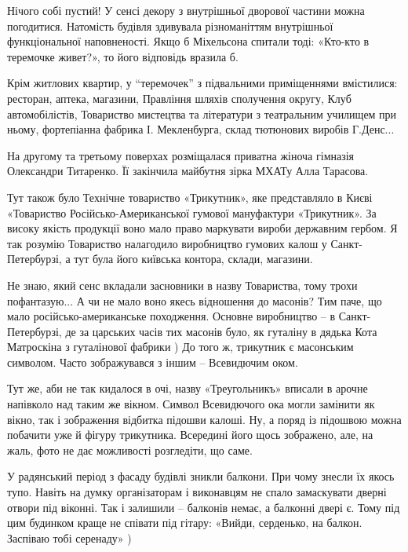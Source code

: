 Нічого собі пустий! У сенсі декору з внутрішньої дворової частини можна
погодитися. Натомість будівля здивувала різноманіттям внутрішньої
функціональної наповненості. Якщо б Міхельсона спитали тоді: «Кто-кто в
теремочке живет?», то його відповідь вразила б.

Крім житлових квартир, у \enquote{теремочек} з підвальними приміщеннями вмістилися:
ресторан, аптека, магазини, Правління шляхів сполучення округу, Клуб
автомобілістів, Товариство мистецтва та літератури з театральним училищем при
ньому, фортепіанна фабрика І. Мекленбурга, склад тютюнових виробів Г.Денс...

На другому та третьому поверхах розміщалася приватна жіноча гімназія Олександри
Титаренко. Її закінчила майбутня зірка МХАТу Алла Тарасова.

Тут також було Технічне товариство «Трикутник», яке представляло в Києві
«Товариство Російсько-Американської гумової мануфактури «Трикутник». За високу
якість продукції воно мало право маркувати вироби державним гербом. Я так
розумію Товариство налагодило виробництво гумових калош у Санкт-Петербурзі, а
тут була його київська контора, склади, магазини.

Не знаю, який сенс вкладали засновники в назву Товариства, тому трохи
пофантазую... А чи не мало воно якесь відношення до масонів? Тим паче, що мало
російсько-американське походження. Основне виробництво – в Санкт-Петербурзі, де
за царських часів тих масонів було, як гуталіну в дядька Кота Матроскіна з
гуталінової фабрики ) До того ж, трикутник є масонським символом. Часто
зображувався з іншим – Всевидючим оком.

Тут же, аби не так кидалося в очі, назву «Треугольникъ» вписали в арочне
напівколо над таким же вікном. Символ Всевидючого ока могли замінити як вікно,
так і зображення відбитка підошви калоші. Ну, а поряд із підошвою можна
побачити уже й фігуру трикутника. Всередині його щось зображено, але, на жаль,
фото не дає можливості розгледіти, що саме.

У радянський період з фасаду будівлі зникли балкони. При чому знесли їх якось
тупо. Навіть на думку організаторам і виконавцям не спало замаскувати дверні
отвори під віконні. Так і залишили – балконів немає, а балконні двері є. Тому
під цим будинком краще не співати під гітару: «Вийди, серденько, на балкон.
Заспіваю тобі серенаду» )
